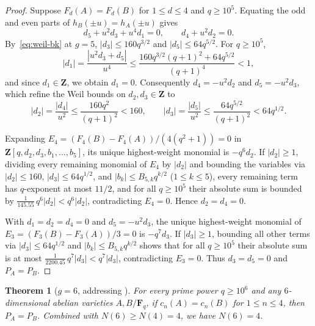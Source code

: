 \documentclass[11pt]{amsart}
\newtheorem{theorem}{Theorem}[section]
\theoremstyle{remark}
\newcommand{\F}{\mathbf{F}}
\newcommand{\Z}{\mathbf{Z}}
\begin{document}
\begin{proof}
Suppose $F_d(A) = F_d(B)$ for $1 \le d \le 4$ and $q \ge 10^5$. Equating the odd and even parts of $h_B(\pm u) = h_A(\pm u)$ gives
\[
d_5 + u^2 d_3 + u^4 d_1 = 0, \qquad d_4 + u^2 d_2 = 0.
\]
By~\eqref{eq:weil-bk} at $g = 5$, $|d_3| \le 160 q^{3/2}$ and $|d_5| \le 64 q^{5/2}$. For $q \ge 10^5$,
\[
|d_1| = \frac{|u^2 d_3 + d_5|}{u^4} \le \frac{160 q^{3/2}(q + 1)^2 + 64 q^{5/2}}{(q + 1)^4} < 1,
\]
and since $d_1 \in \Z$, we obtain $d_1 = 0$. Consequently $d_4 = -u^2 d_2$ and $d_5 = -u^2 d_3$, which refine the Weil bounds on $d_2, d_3 \in \Z$ to
\[
|d_2| = \frac{|d_4|}{u^2} \le \frac{160 q^2}{(q + 1)^2} < 160, \qquad |d_3| = \frac{|d_5|}{u^2} \le \frac{64 q^{5/2}}{(q + 1)^2} < 64 q^{1/2}.
\]

Expanding $E_4 = (F_4(B) - F_4(A))/(4(q^2 + 1)) = 0$ in $\Z[q, d_2, d_3, b_1, \dots, b_5]$, its unique highest-weight monomial is $-q^6 d_2$. If $|d_2| \ge 1$, dividing every remaining monomial of $E_4$ by $|d_2|$ and bounding the variables via $|d_2| \le 160$, $|d_3| \le 64 q^{1/2}$, and $|b_k| \le B_{5,k} q^{k/2}$ ($1 \le k \le 5$), every remaining term has $q$-exponent at most $11/2$, and for all $q \ge 10^5$ their absolute sum is bounded by $\frac{1}{145.55}\, q^6 |d_2| < q^6 |d_2|$, contradicting $E_4 = 0$. Hence $d_2 = d_4 = 0$.

With $d_1 = d_2 = d_4 = 0$ and $d_5 = -u^2 d_3$, the unique highest-weight monomial of $E_3 = (F_3(B) - F_3(A))/3 = 0$ is $-q^7 d_3$. If $|d_3| \ge 1$, bounding all other terms via $|d_3| \le 64 q^{1/2}$ and $|b_k| \le B_{5,k} q^{k/2}$ shows that for all $q \ge 10^5$ their absolute sum is at most $\frac{1}{2200.45}\, q^7 |d_3| < q^7 |d_3|$, contradicting $E_3 = 0$. Thus $d_3 = d_5 = 0$ and $P_A = P_B$.
\end{proof}

\begin{theorem}[$g = 6$, addressing {\cite[Question~7.8]{CK26}}]\label{thm:g6}
For every prime power $q \ge 10^6$ and any $6$-dimensional abelian varieties $A, B / \F_q$, if $c_n(A) = c_n(B)$ for $1 \le n \le 4$, then $P_A = P_B$. Combined with $N(6) \ge N(4) = 4$, we have $N(6) = 4$.
\end{theorem}
\end{document}
